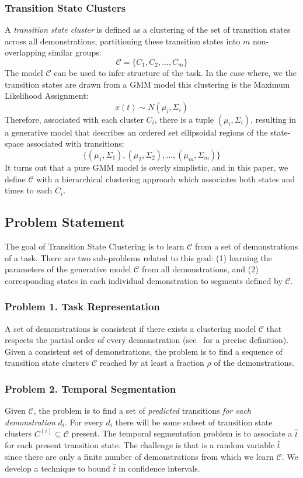 \documentclass[0-main.tex]{subfiles}
\begin{document}
\subsubsection{Transition State Clusters}
A \emph{transition state cluster} is
defined as a clustering of the set of transition states across all demonstrations; partitioning these transition states into $m$ non-overlapping similar groups:
\[
\mathcal{C} = \{C_1, C_2,...,C_m\}
\]
The model $\mathcal{C}$ can be used to infer structure of the task.
In the case where, we the transition states are drawn from a GMM model this clustering is the Maximum Likelihood Assignment: 
\[{x}(t) \sim N(\mu_i, \Sigma_i)\]
Therefore, associated with each cluster $C_i$, there is a tuple $(\mu_i, \Sigma_i)$, resulting in a generative model that describes an ordered set ellipsoidal regions of the state-space associated with transitions:
\[
\{(\mu_1, \Sigma_1),(\mu_2, \Sigma_2),...,(\mu_m, \Sigma_m) \}
\]
It turns out that a pure GMM model is overly simplistic, and in this paper, we define $\mathcal{C}$ with a hierarchical clustering approach which associates both states and times to each $C_i$.

\subsection{Problem Statement}
The goal of Transition State Clustering is to learn $\mathcal{C}$ from a set of demonstrations of a task. There are two sub-problems related to this goal: (1) learning the parameters of the generative model $\mathcal{C}$ from all demonstrations, and (2) corresponding states in each individual demonstration to segments defined by $\mathcal{C}$. 

\subsubsection{Problem 1. Task Representation}
A set of demonstrations is consistent if there exists a clustering model $\mathcal{C}$ that respects the partial order of every demonstration (see~\cite{krishnan2015tsc} for a precise definition).
Given a consistent set of demonstrations, the problem is to find a sequence of transition state clusters $\mathcal{C}$ reached by at least a fraction $\rho$ of the demonstrations. 
\subsubsection{Problem 2. Temporal Segmentation}
Given $\mathcal{C}$, the problem is to find a set of \textit{predicted} transitions \textit{for each demonstration} $d_i$. For every $d_i$ there will be some subset of transition state clusters $C^(i) \subseteq \mathcal{C}$ present. The temporal segmentation problem is to associate a $\hat{t}$ for each present transition state. The challenge is that is a random variable $\hat{t}$ since there are only a finite number of demonstrations from which we learn $\mathcal{C}$. We develop a technique to bound $\hat{t}$ in confidence intervals.
\end{document}
